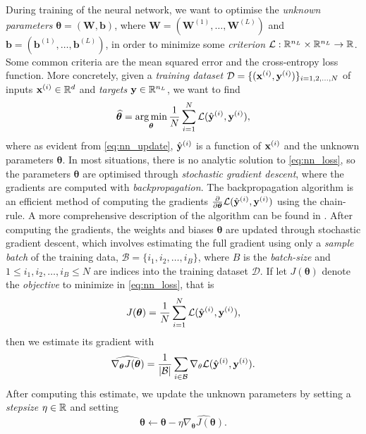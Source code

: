 \documentclass{statsmsc}
\begin{document}
During training of the neural network, we want to optimise the \textit{unknown
parameters} $\bm{\theta}=(\mathbf{W}, \mathbf{b})$, where
$\mathbf{W}=\left(\boldsymbol{W}^{(1)},\dots,\boldsymbol{W}^{(L)}\right)$ and
$\mathbf{b}=\left(\boldsymbol{b}^{(1)},\dots,\boldsymbol{b}^{(L)}\right)$, in
order to minimize some \textit{criterion} $\mathcal{L}: \mathbb{R}^{n_L} \times \mathbb{R}^{n_L}
\rightarrow {\mathbb{R}}$. Some common criteria are the mean squared error and the
cross-entropy loss function.
More concretely, given a \textit{training dataset }
$\mathcal{D}=\{(\mathbf{x}^{(i)}, \mathbf{y}^{(i)})\}_{i=1,2,\dots,N}$ of inputs
$\mathbf{x}^{(i)} \in \mathbb{R}^d$ and \textit{targets} $\mathbf{y} \in \mathbb{R}^{n_L}$, we want to find
\begin{equation}\label{eq:nn_loss}
    \widehat{\bm\theta}= \operatorname*{arg\,min}_{\bm\theta}
    \frac{1}{N}  \sum^{N}_{i=1} \mathcal{L}(\hat{\mathbf{y}}^{(i)}, \mathbf{y}^{(i)}),
\end{equation}
where as evident from \cref{eq:nn_update}, $\hat{\mathbf{y}}^{(i)}$ is a function of
$\mathbf{x}^{(i)}$ and the unknown parameters $\bm\theta$.
In most situations, there is no analytic solution to \cref{eq:nn_loss}, so
the parameters $\bm\theta$ are optimised through \textit{stochastic gradient descent},
where the gradients are computed with \textit{backpropagation}.
The backpropagation algorithm is an efficient method of computing the gradients
$\frac{\partial }{\partial \bm\theta} \mathcal{L}(\hat{\mathbf{y}}^{(i)}, \mathbf{y}^{(i)}) $
using the chain-rule. A more comprehensive description of the algorithm can be
found in \citep{backprop}.
After computing the gradients, the weights and biases $\bm\theta$ are updated through
stochastic gradient descent, which involves estimating
the full gradient using only a \textit{sample batch} of the training data,
$\mathcal{B}=\{i_1,i_2,\dots,i_B\}$, where $B$ is the \textit{batch-size} and
$1\leq i_1,i_2,\dots,i_B \leq N$ are indices into the training dataset $\mathcal{D}$.
If let $J(\bm\theta)$ denote the \textit{objective} to minimize in \cref{eq:nn_loss}, that is
\begin{equation}
    J(\bm\theta)=\frac{1}{N} \sum^{N}_{i=1} \mathcal{L}(\hat{\mathbf{y}}^{(i)}, {\mathbf{y}}^{(i)}),
\end{equation}
then we estimate its gradient with
\begin{equation}
    \widehat{\nabla_{\bm\theta} J(\bm\theta)} = \frac{1}{|\mathcal{B}|} \sum_{i \in \mathcal{B}} 
    \nabla_{\mathbf{\theta}} \mathcal{L}(\hat{\mathbf{y}}^{(i)}, {\mathbf{y}}^{(i)}).
\end{equation}
After computing this estimate, we update the unknown parameters by setting a \textit{stepsize}
$\eta \in \mathbb{R}$ and setting
\begin{equation}
    \bm\theta \leftarrow \bm\theta - \eta \widehat{\nabla_{\bm\theta} J(\bm\theta)}.
\end{equation}
\end{document}
